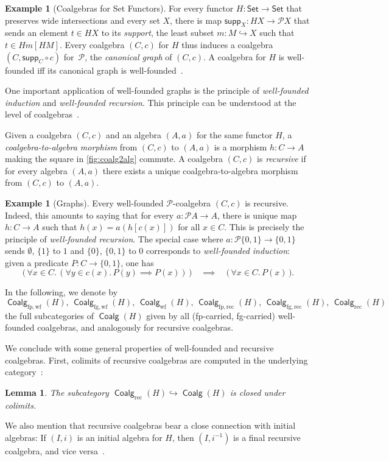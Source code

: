 \documentclass[10pt,a4paper]{article}
\newtheorem{lemma}[theorem]{Lemma}
\theoremstyle{definition}
\newtheorem{example}[theorem]{Example}
\theoremstyle{remark}
\numberwithin{equation}{section}
\providecommand{\catname}{\mathsf}
\def\Set{\catname{Set}}
\newcommand{\Pow}{\mathcal{P}}
\newcommand{\supp}{\mathsf{supp}}
\newcommand{\fp}{{\mathrm{fp}}}
\newcommand{\fg}{{\mathrm{fg}}}
\newcommand{\rec}{{\mathrm{rec}}}
\newcommand{\wf}{{\mathrm{wf}}}
\DeclareMathOperator{\Coalg}{\mathsf{Coalg}}
\newcommand{\subto}{\hookrightarrow}
\theoremstyle{plain}
\theoremstyle{definition}
\begin{document}
\begin{example}[Coalgebras for Set Functors]
For every functor $H\colon \Set\to \Set$ that preserves wide intersections and every set $X$, there is map $\supp_X\colon HX\to \Pow X$ that sends an element $t\in HX$ to its \emph{support}, the least subset $m\colon M\subto X$ such that $t\in Hm[HM]$. Every coalgebra $(C,c)$ for $H$ thus induces a coalgebra $(C,\supp_C\circ c)$ for~$\Pow$, the \emph{canonical graph} of $(C,c)$. A coalgebra for $H$ is well-founded iff its canonical graph is well-founded~\cite[Rem.~6.3.4]{taylor99}.
\end{example}
One important application of well-founded graphs is the principle of \emph{well-founded induction} and \emph{well-founded recursion}. This principle can be understood at the level of coalgebras~\cite{taylor99}. 

Given a coalgebra $(C,c)$ and an algebra $(A,a)$ for the same functor $H$, a \emph{coalgebra-to-algebra morphism} from $(C,c)$ to $(A,a)$ is a morphism $h\colon C\to A$ making the square in \autoref{fig:coalg2alg} commute. A coalgebra $(C,c)$ is \emph{recursive} if for every algebra $(A,a)$ there exists a unique coalgebra-to-algebra morphism from $(C,c)$ to $(A,a)$.

\begin{example}[Graphs]
Every well-founded $\Pow$-coalgebra $(C,c)$ is recursive. Indeed, this amounts to saying that for every $a\colon \Pow A \to A$, there is unique map $h\colon C\to A$ such that $h(x)=a(h[c(x)])$ for all $x\in C$. This is precisely the principle of \emph{well-founded recursion}. The special case where $a\colon \Pow\{0,1\}\to \{0,1\}$ sends $\emptyset$, $\{1\}$ to $1$ and $\{0\}$, $\{0,1\}$ to $0$ corresponds to \emph{well-founded induction}: given a predicate $P\colon C\to \{0,1\}$, one has
\[ \big(\,\forall x\in C.\, (\forall y\in c(x).\, P(y) \implies P(x))\,\big) \quad\implies\quad \big(\,\forall x\in C.\, P(x)\,\big). \] 
\end{example}
\noindent
In the following, we denote by
\[\Coalg_{\fp,\wf}(H),\, \Coalg_{\fg,\wf}(H),\, \Coalg_\wf(H),\, \Coalg_{\fp,\rec}(H),\, \Coalg_{\fg,\rec}(H),\, \Coalg_\rec(H) \] 
the full subcategories of $\Coalg(H)$ given by all (fp-carried, fg-carried)  well-founded coalgebras, and analogously for recursive coalgebras. 

We conclude with some general properties of well-founded and recursive coalgebras. First, colimits of recursive coalgebras are computed in the underlying category~\cite[Prop.~7.1.9]{amm25}:
\begin{lemma}\label{lem:rec-coalg-colimits}
The subcategory $\Coalg_\rec(H)\subto \Coalg(H)$ is closed under colimits.
\end{lemma}
We also mention that recursive coalgebras bear a close connection with initial algebras: If $(I,i)$ is an initial algebra for $H$, then $(I,i^{-1})$ is a final recursive coalgebra, and vice versa~\cite{cuv06}.
\end{document}
